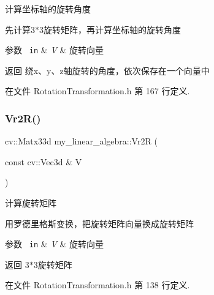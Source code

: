 计算坐标轴的旋转角度 

先计算3$\ast$3旋转矩阵，再计算坐标轴的旋转角度


\begin{DoxyParams}[1]{参数}
\mbox{\texttt{ in}}  & {\em V} & 旋转向量 \\
\hline
\end{DoxyParams}
\begin{DoxyReturn}{返回}
绕x、y、z轴旋转的角度，依次保存在一个向量中 
\end{DoxyReturn}


在文件 Rotation\+Transformation.\+h 第 167 行定义.

\mbox{\label{namespacemy__linear__algebra_a3db83bdbd9660f8f1f408d4fb4a65dae}} 
\subsubsection{\texorpdfstring{Vr2R()}{Vr2R()}}
{\footnotesize\ttfamily cv\+::\+Matx33d my\+\_\+linear\+\_\+algebra\+::\+Vr2R (\begin{DoxyParamCaption}\item[{const cv\+::\+Vec3d \&}]{V }\end{DoxyParamCaption})}



计算旋转矩阵 

用罗德里格斯变换，把旋转矩阵向量换成旋转矩阵


\begin{DoxyParams}[1]{参数}
\mbox{\texttt{ in}}  & {\em V} & 旋转向量 \\
\hline
\end{DoxyParams}
\begin{DoxyReturn}{返回}
3$\ast$3旋转矩阵 
\end{DoxyReturn}


在文件 Rotation\+Transformation.\+h 第 138 行定义.


